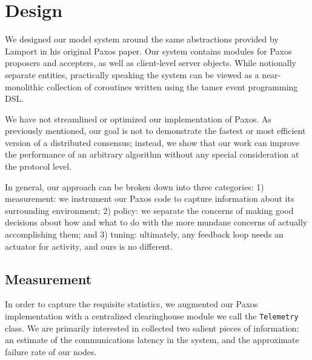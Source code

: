 
\newcommand{\Tbf}{T_{\mathit{bf}}}
\newcommand{\Thb}{T_{\mathit{hb}}}
\newcommand{\Tto}{T_{\mathit{to}}}
\newcommand{\Tl}{T_{\mathit{l}}}
\newcommand{\Cr}{C_{\mathit{r}}}
\newcommand{\Chb}{C_{\mathit{hb}}}
\newcommand{\Pff}{P_{\mathit{ff}}}
\newcommand{\Ptf}{P_{\mathit{tf}}}

\section{Design}
We designed our model system around the same abstractions provided by Lamport in his original Paxos paper.
Our system contains modules for Paxos proposers and accepters, as well as client-level server objects.
While notionally separate entities, practically speaking the system can be viewed as a near-monolithic collection of coroutines written using the tamer \cite{Krohn07} event programming DSL.

We have not streamlined or optimized our implementation of Paxos.
As previously mentioned, our goal is not to demonstrate the fastest or most efficient version of a distributed consensus;
instead, we show that our work can improve the performance of an arbitrary algorithm without any special consideration at the protocol level.

In general, our approach can be broken down into three categories:
1) measurement: we instrument our Paxos code to capture information about its surrounding environment;
2) policy: we separate the concerns of making good decisions about how and what to do with the more mundane concerns of actually accomplishing them;
and 3) tuning: ultimately, any feedback loop needs an actuator for activity, and ours is no different.

\subsection{Measurement}
In order to capture the requisite statistics, we augmented our Paxos implementation with a centralized clearinghouse module we call the \texttt{Telemetry} class.
We are primarily interested in collected two salient pieces of information:
an estimate of the communications latency in the system, and the approximate failure rate of our nodes.

